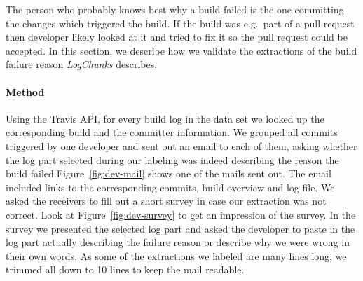 \documentclass[\myrootdir/main.tex]{subfiles}
\begin{document}
The person who probably knows best why a build failed is the one committing the changes which triggered the build.
If the build was e.g.\ part of a pull request then developer likely looked at it and tried to fix it so the pull request could be accepted.
In this section, we describe how we validate the extractions of the build failure reason \emph{LogChunks} describes.
\paragraph{Method}
Using the Travis API, for every build log in the data set we looked up the corresponding build and the committer information.
We grouped all commits triggered by one developer and sent out an email to each of them, asking whether the log part selected during our labeling was indeed describing the reason the build failed.Figure~\ref{fig:dev-mail} shows one of the mails sent out.
The email included links to the corresponding commits, build overview and log file.
We asked the receivers to fill out a short survey in case our extraction was not correct.
Look at Figure~\ref{fig:dev-survey} to get an impression of the survey.
In the survey we presented the selected log part and asked the developer to paste in the log part actually describing the failure reason or describe why we were wrong in their own words.
As some of the extractions we labeled are many lines long, we trimmed all down to 10 lines to keep the mail readable.
\end{document}
